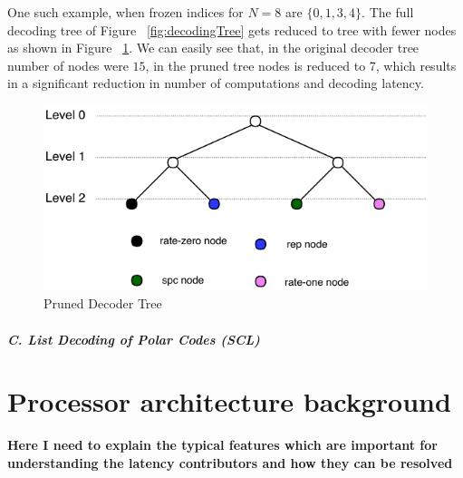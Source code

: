 One such example, when frozen indices for $N = 8$ are $\{0,1,3,4\}$. The full decoding tree of Figure ~\ref{fig:decodingTree} gets reduced to tree with fewer nodes as shown in Figure ~\ref{fig:decodingTreePruned}. We can easily see that, in the original decoder tree number of nodes were $15$, in the pruned tree nodes is reduced to 7, which results in a significant reduction in number of computations and decoding latency.

\begin{figure}[h]
	\centering
	\includegraphics{./figures/decodingTreePruned.pdf}
	\caption{Pruned Decoder Tree}
	\label{fig:decodingTreePruned}
\end{figure}


\paragraph{\emph{C. List Decoding of Polar Codes (SCL)}\newline}  \label{SCL}


\section{Processor architecture background \newline}

\textbf{Here I need to explain the typical features which are important for understanding the latency contributors and how they can be resolved}

